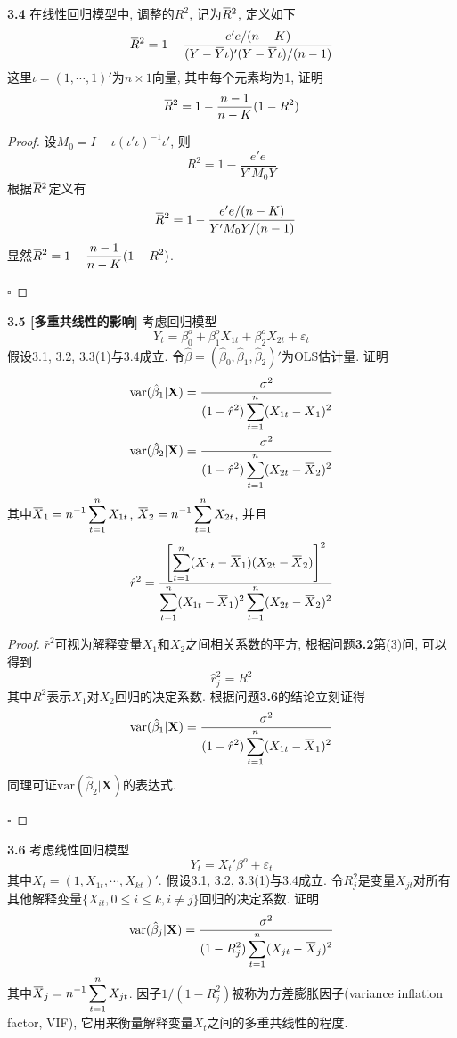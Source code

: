 \documentclass[cn,12pt,math=mtpro2,citestyle=gb7714-2015,bibstyle=gb7714-2015,twocol,mode=simple]{elegantbook}
\newcommand{\overbar}[1]{\mkern 1.5mu\overline{\mkern-1.5mu#1\mkern-1.5mu}\mkern 1.5mu}
\newcommand{\var}{\text{var}}
\newcommand{\hbeta}{\hat{\beta}}
\begin{document}
\textbf{3.4} 在线性回归模型中, 调整的$R^2$, 记为$\overbar{R}^2$, 定义如下
$$\overbar{R}^2=1-\frac{e'e/(n-K)}{(Y-\overbar{Y}\iota)'(Y-\overbar{Y}\iota)/(n-1)}$$
这里$\iota=(1,\cdots,1)'$为$n \times 1$向量, 其中每个元素均为1, 证明
$$\overbar{R}^2=1-\frac{n-1}{n-K}(1-R^2)$$

\begin{proof}
  设$M_0=I-\iota(\iota'\iota)^{-1}\iota'$, 则
  $$R^2=1-\frac{e'e}{Y'M_0Y}$$
  根据$\overbar{R}^2$定义有
 \begin{align*}
 \overbar{R}^2&=1-\frac{e'e/(n-K)}{Y'M_0Y/(n-1)}
 \end{align*}
 显然$\displaystyle\overbar{R}^2=1-\frac{n-1}{n-K}(1-R^2)$.

 $\square$
\end{proof}

\textbf{3.5 [多重共线性的影响]} 考虑回归模型
$$Y_t=\beta_0^o+\beta_1^oX_{1t}+\beta_2^oX_{2t}+\varepsilon_t$$
假设3.1, 3.2, 3.3(1)与3.4成立. 令$\hbeta=(\hbeta_0,\hbeta_1,\hbeta_2)'$为OLS估计量. 证明
\begin{align*}
&\var(\hbeta_1|\mathbf{X})=\frac{\sigma^2}{\displaystyle (1-\hat{r}^2)\sum_{t=1}^{n}(X_{1t}-\overbar{X}_1)^2} \\
&\var(\hbeta_2|\mathbf{X})=\frac{\sigma^2}{\displaystyle (1-\hat{r}^2)\sum_{t=1}^{n}(X_{2t}-\overbar{X}_2)^2}
\end{align*}
其中$\displaystyle \overbar{X}_1=n^{-1}\sum_{t=1}^{n}X_{1t}$, $\displaystyle \overbar{X}_2=n^{-1}\sum_{t=1}^{n}X_{2t}$, 并且
$$\hat{r}^2=\frac{\displaystyle \left[\sum_{t=1}^{n}(X_{1t}-\overbar{X}_1)(X_{2t}-\overbar{X}_2)\right]^2}{\displaystyle\sum_{t=1}^{n}(X_{1t}-\overbar{X}_1)^2\sum_{t=1}^{n}(X_{2t}-\overbar{X}_2)^2}$$

\begin{proof}
  $\hat{r}^2$可视为解释变量$X_1$和$X_2$之间相关系数的平方, 根据问题\textbf{3.2}第(3)问, 可以得到
  $$\hat{r}_j^2=R^2$$
  其中$R^2$表示$X_1$对$X_2$回归的决定系数. 根据问题\textbf{3.6}的结论立刻证得
  $$\var(\hbeta_1|\mathbf{X})=\frac{\sigma^2}{\displaystyle (1-\hat{r}^2)\sum_{t=1}^{n}(X_{1t}-\overbar{X}_1)^2}$$
  同理可证$\var(\hbeta_2|\mathbf{X})$的表达式.

  $\square$
\end{proof}

\textbf{3.6} 考虑线性回归模型
$$Y_t=X_t'\beta^o+\varepsilon_t$$
其中$X_t=(1,X_{1t},\cdots,X_{kt})'$. 假设3.1, 3.2, 3.3(1)与3.4成立. 令$R_j^2$是变量$X_{jt}$对所有其他解释变量$\{X_{it},0\leq i \leq k, i \neq j\}$回归的决定系数. 证明
$$\var(\hbeta_j|\mathbf{X})=\frac{\sigma^2}{\displaystyle(1-R_j^2)\sum_{t=1}^{n}(X_{jt}-\overbar{X}_j)^2}$$
其中$\displaystyle\overbar{X}_j=n^{-1}\sum_{t=1}^{n}X_{jt}$. 因子$1/(1-R_j^2)$被称为方差膨胀因子(variance inflation factor, VIF), 它用来衡量解释变量$X_t$之间的多重共线性的程度.
\end{document}
